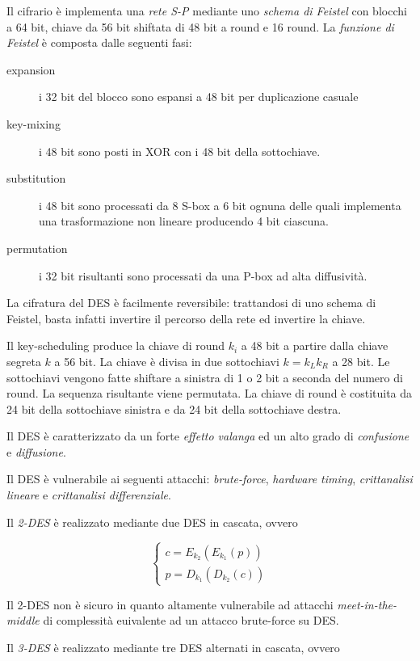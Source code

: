 Il cifrario è implementa una \textit{rete S-P} mediante uno \textit{schema di Feistel} con blocchi a 64 bit, chiave da 56 bit shiftata di 48 bit a round e 16 round.
La \textit{funzione di Feistel} è composta dalle seguenti fasi:
\begin{description}
  \item[expansion] i 32 bit del blocco sono espansi a 48 bit per duplicazione casuale
  \item[key-mixing] i 48 bit sono posti in XOR con i 48 bit della sottochiave.
  \item[substitution] i 48 bit sono processati da 8 S-box a 6 bit ognuna delle quali implementa una trasformazione non lineare producendo 4 bit ciascuna.
  \item[permutation] i 32 bit risultanti sono processati da una P-box ad alta diffusività.
\end{description}

La cifratura del DES è facilmente reversibile: trattandosi di uno schema di Feistel, basta infatti invertire il percorso della rete ed invertire la chiave.

Il key-scheduling produce la chiave di round $k_{i}$ a 48 bit a partire dalla chiave segreta $k$ a 56 bit. La chiave è divisa in due sottochiavi $k=k_{L}k_{R}$ a 28 bit. Le sottochiavi vengono fatte shiftare a sinistra di 1 o 2 bit a seconda del numero di round. La sequenza risultante viene permutata. La chiave di round è costituita da 24 bit della sottochiave sinistra e da 24 bit della sottochiave destra.

Il DES è caratterizzato da un forte \textit{effetto valanga} ed un alto grado di \textit{confusione} e \textit{diffusione}.

Il DES è vulnerabile ai seguenti attacchi: \textit{brute-force}, \textit{hardware timing}, \textit{crittanalisi lineare} e \textit{crittanalisi differenziale}.

Il \textit{2-DES} è realizzato mediante due DES in cascata, ovvero

$$
\begin{cases}
  c=E_{k_{2}}(E_{k_{1}}(p))\\
  p=D_{k_{1}}(D_{k_{2}}(c))
\end{cases}
$$

Il 2-DES non è sicuro in quanto altamente vulnerabile ad attacchi \textit{meet-in-the-middle} di complessità euivalente ad un attacco brute-force su DES.

Il \textit{3-DES} è realizzato mediante tre DES alternati in cascata, ovvero

